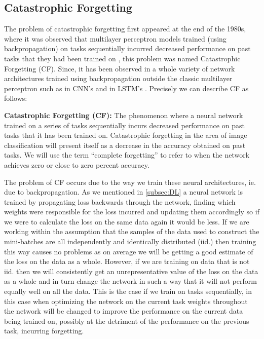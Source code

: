 \subsection{Catastrophic Forgetting}
\label{subsec:CF}
The problem of catastrophic forgetting first appeared at the end of the 1980s, where it was observed that multilayer perceptron models trained (using backpropagation) on tasks sequentially incurred decreased performance on past tasks that they had been trained on \cite{ratcliff1990catastrophic,mccloskey1989catastrophic,french1999catastrophic}, this problem was named Catastrophic Forgetting (CF). Since, it has been observed in a whole variety of network architectures trained using backpropagation outside the classic multilayer perceptron such as in CNN's \cite{arora2019does} and in LSTM's \cite{schak2019study}. Precisely we can describe CF as follows:
\begin{definition}
    \textbf{Catastrophic Forgetting (CF):} The phenomenon where a neural network trained on a series of tasks sequentially incurs decreased performance on past tasks that it has been trained on. Catastrophic forgetting in the area of image classification will present itself as a decrease in the accuracy obtained on past tasks. We will use the term ``complete forgetting'' to refer to when the network achieves zero or close to zero percent accuracy.
\end{definition}
The problem of CF occurs due to the way we train these neural architectures, ie. due to backpropagation. As we mentioned in \ref{subsec:DL} a neural network is trained by propagating loss backwards through the network, finding which weights were responsible for the loss incurred and updating them accordingly so if we were to calculate the loss on the same data again it would be less. If we are working within the assumption that the samples of the data used to construct the mini-batches are all independently and identically distributed (iid.) then training this way causes no problems as on average we will be getting a good estimate of the loss on the data as a whole. However, if we are training on data that is not iid. then we will consistently get an unrepresentative value of the loss on the data as a whole and in turn change the network in such a way that it will not perform equally well on all the data. This is the case if we train on tasks sequentially, in this case when optimizing the network on the current task weights throughout the network will be changed to improve the performance on the current data being trained on, possibly at the detriment of the performance on the previous task, incurring forgetting.

